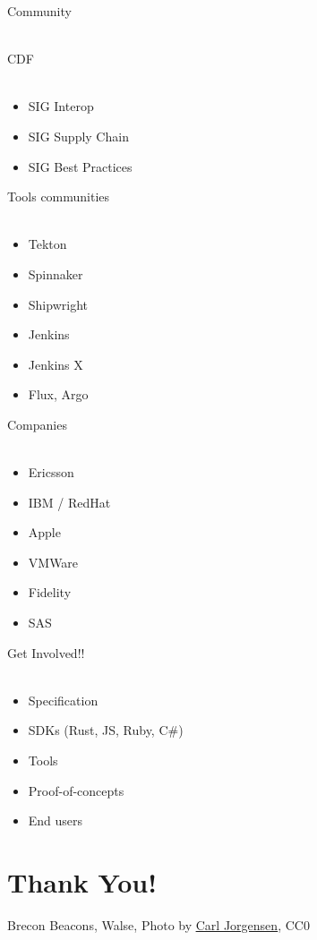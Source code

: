 \documentclass[aspectratio=169,11pt,hyperref={colorlinks=true}]{beamer}
\begin{document}
\begin{stripedframe}%
  {%
  Community
  ~ \\
  ~ \\
  }%
  {%
  CDF \\
  ~
  \begin{itemize}
    \item SIG Interop
    \item SIG Supply Chain
    \item SIG Best Practices
  \end{itemize}
  }%
  {%
  Tools communities \\
  ~
  \begin{itemize}
    \item Tekton
    \item Spinnaker
    \item Shipwright
    \item Jenkins
    \item Jenkins X
    \item Flux, Argo
  \end{itemize}
  }%
  {%
  Companies \\
  ~
  \begin{itemize}
    \item Ericsson
    \item IBM / RedHat
    \item Apple
    \item VMWare
    \item Fidelity
    \item SAS
  \end{itemize}
  }%
  {%
  Get Involved!! \\
  ~
  \begin{itemize}
    \item Specification
    \item SDKs (Rust, JS, Ruby, C\#)
    \item Tools
    \item Proof-of-concepts
    \item End users
  \end{itemize}
  }%
\end{stripedframe}

\section[Thank You]{Thank You!}

\begin{sectionwithpiclargecentral}{Brecon Beacons, Walse, Photo by \href{https://unsplash.com/@scamartist}{\underline{Carl Jorgensen}}, CC0}
\end{sectionwithpiclargecentral}
\end{document}
